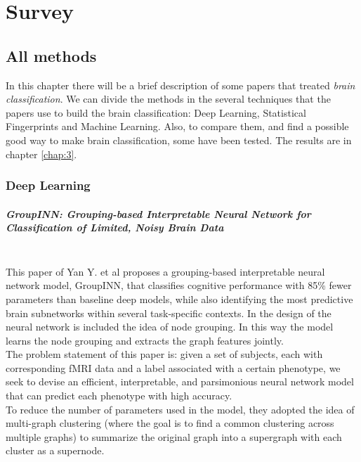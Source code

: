 \chapter{Survey}
\label{chap:2} 

\section{All methods}
In this chapter there will be a brief description of some papers that treated \textit{brain classification}. We can divide the methods in the several techniques that the papers use to build the brain classification: Deep Learning, Statistical Fingerprints and Machine Learning. Also, to compare them, and find a possible good way to make brain classification, some have been tested. The results are in chapter \ref{chap:3}.

\subsection{Deep Learning}
\paragraph{GroupINN: Grouping-based Interpretable Neural Network for Classification of Limited, Noisy Brain Data}\
\\

This paper of Yan Y. et al \cite{groupinn} proposes a grouping-based interpretable neural network model, GroupINN, that classifies cognitive performance with 85\% fewer parameters than baseline deep models, while also identifying the most predictive brain subnetworks within several task-specific contexts. In the design of the neural network is included the idea of node grouping. In this way the model learns the node grouping and extracts the graph features jointly.
\\

The problem statement of this paper is: given a set of subjects, each with corresponding fMRI data and a label associated with a certain phenotype, we seek to devise an efficient, interpretable, and parsimonious neural network model that can predict each phenotype with high accuracy.
\\

To reduce the number of parameters used in the model, they adopted the idea of multi-graph clustering (where the goal is to find a common clustering across multiple graphs) to summarize the original graph into a supergraph with each cluster as a supernode. 
\\

